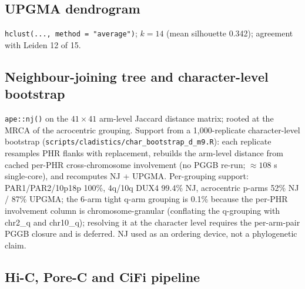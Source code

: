 \documentclass[pdflatex,mathphys]{jnl}
\begin{document}
\subsection*{UPGMA dendrogram}

\texttt{hclust(..., method = "average")}; $k = 14$ (mean silhouette 0.342);
agreement with Leiden 12 of 15.

\subsection*{Neighbour-joining tree and character-level bootstrap}

\texttt{ape::nj()} on the $41 \times 41$ arm-level Jaccard distance matrix;
rooted at the MRCA of the acrocentric grouping.
Support from a 1,000-replicate character-level bootstrap
(\texttt{scripts/cladistics/char\_bootstrap\_d\_m9.R}): each replicate
resamples PHR flanks with replacement, rebuilds the arm-level distance from
cached per-PHR cross-chromosome involvement (no PGGB re-run; $\approx 108$ s
single-core), and recomputes NJ + UPGMA.
Per-grouping support: PAR1/PAR2/10p18p 100\%, 4q/10q DUX4 99.4\% NJ,
acrocentric p-arms 52\% NJ / 87\% UPGMA; the 6-arm tight q-arm grouping is
0.1\% because the per-PHR involvement column is chromosome-granular (conflating
the q-grouping with chr2\_q and chr10\_q); resolving it at the character level
requires the per-arm-pair PGGB closure and is deferred.
NJ used as an ordering device, not a phylogenetic claim.

\subsection*{Hi-C, Pore-C and CiFi pipeline}
\end{document}
